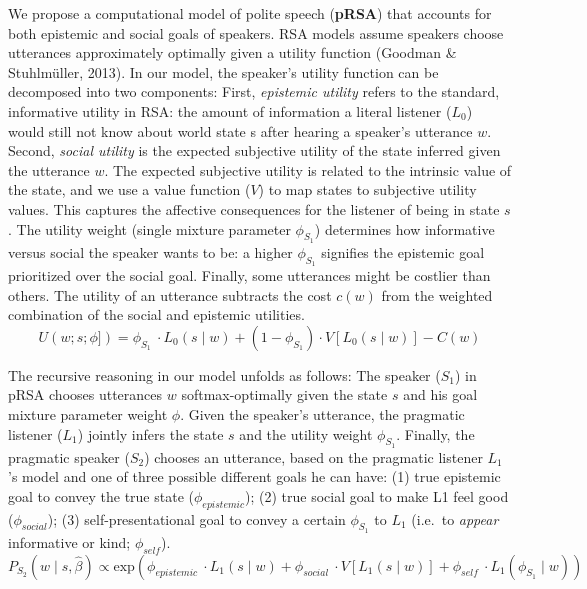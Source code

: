 \documentclass[english,floatsintext,man]{apa6}
\theoremstyle{definition}
\theoremstyle{definition}
\theoremstyle{definition}
\theoremstyle{remark}
\begin{document}
We propose a computational model of polite speech (\textbf{pRSA}) that
accounts for both epistemic and social goals of speakers. RSA models
assume speakers choose utterances approximately optimally given a
utility function (Goodman \& Stuhlmüller, 2013). In our model, the
speaker's utility function can be decomposed into two components: First,
\emph{epistemic utility} refers to the standard, informative utility in
RSA: the amount of information a literal listener (\(L_0\)) would still
not know about world state s after hearing a speaker's utterance \(w\).
Second, \emph{social utility} is the expected subjective utility of the
state inferred given the utterance \(w\). The expected subjective
utility is related to the intrinsic value of the state, and we use a
value function (\(V\)) to map states to subjective utility values. This
captures the affective consequences for the listener of being in state
\(s\). The utility weight (single mixture parameter \(\phi_{S_1}\))
determines how informative versus social the speaker wants to be: a
higher \(\phi_{S_1}\) signifies the epistemic goal prioritized over the
social goal. Finally, some utterances might be costlier than others. The
utility of an utterance subtracts the cost \(c(w)\) from the weighted
combination of the social and epistemic utilities.
\[U(w; s; \phi]) = \phi_{S_1}\ \cdot L_0(s \mid w) + 
(1 - \phi_{S_1}) \cdot V[L_0(s \mid w)]  - C(w)\]

The recursive reasoning in our model unfolds as follows: The speaker
(\(S_1\)) in pRSA chooses utterances \(w\) softmax-optimally given the
state \(s\) and his goal mixture parameter weight \(\phi\). Given the
speaker's utterance, the pragmatic listener (\(L_1\)) jointly infers the
state \(s\) and the utility weight \(\phi_{S_1}\). Finally, the
pragmatic speaker (\(S_2\)) chooses an utterance, based on the pragmatic
listener \(L_1\)'s model and one of three possible different goals he
can have: (1) true epistemic goal to convey the true state
(\(\phi_{epistemic}\)); (2) true social goal to make L1 feel good
(\(\phi_{social}\)); (3) self-presentational goal to convey a certain
\(\phi_{S_1}\) to \(L_1\) (i.e.~to \emph{appear} informative or kind;
\(\phi_{self}\)). \[P_{S_2}(w \mid s, \hat{\beta})\propto 
\mathrm{exp}( \phi_{epistemic}\ \cdot L_1(s \mid w) +
\phi_{social}\ \cdot V[L_1(s \mid w)] + 
\phi_{self}\ \cdot L_1(\phi_{S_1} \mid w) )\]
\end{document}
